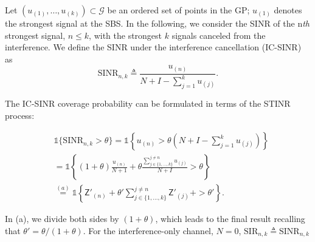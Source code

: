 \documentclass[lettersize,journal]{IEEEtran}
\begin{document}
Let $(u_{(1)},\dots,u_{(k)} )\subset \mathcal{G}$ be an ordered set of points in the GP; $u_{(1)}$ denotes the strongest signal at the SBS. In the following, we consider the SINR of the n\textit{th} strongest signal, $n \leq k$, with the strongest $k$ signals canceled from the interference. We define the SINR under the interference cancellation (IC-SINR) as
\begin{equation}
  \text{SINR}_{n,k} \triangleq \frac{u_{(n)}}{N+I-\sum_{j =1 }^k u_{(j)}}.
\end{equation}


The IC-SINR coverage probability can be formulated in terms of the STINR process:


\begin{align}
  \label{eq:IC-SINRcond}
   & \mathds{1}\{\text{SINR}_{n,k} > \theta \} = \mathds{1} \left\{ u_{(n)} >\theta\left(N+I-  \sum_{j=1}^ku_{(j)}\right)\right\} \nonumber\\
  &\overset{}{=}\mathds{1} \left\{(1+\theta) \frac{u_{(n)}}{N+1}+ \theta \frac{\sum^{j\neq n}_{j\in\{1,\dots,k\}} u_{(j)}}{N+I}>\theta \right\} \nonumber \\
  &\overset{(a)}{=} \mathds{1} \left\{ \mathsf{Z}'_{(n)}+\theta'\sum^{j\neq n}_{j\in\{1,\dots,k\}}\mathsf{Z}'_{(j)} +>\theta'\right\}.
\end{align}


In (a), we divide both sides by $(1+\theta)$, which leads to the final result recalling that $\theta' = \theta/(1+\theta)$. For the interference-only channel, $N=0$, $\text{SIR}_{n,k} \triangleq \text{SINR}_{n,k}$
\end{document}
